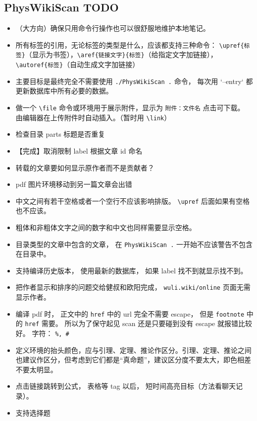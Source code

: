 \subsection{PhysWikiScan TODO}\label{sub_edTODO_6}
\begin{itemize}
\item （大方向）确保只用命令行操作也可以很舒服地维护本地笔记。
\item 所有标签的引用，无论标签的类型是什么，应该都支持三种命令： \verb`\upref{标签}`（显示为书签），\verb`\aref{链接文字}{标签}`（给指定文字加链接）， \verb`\autoref{标签}`（自动生成文字加链接）
\item 主要目标是最终完全不需要使用 \verb`./PhysWikiScan .` 命令， 每次用 `--entry` 都更新数据库中所有必要的数据。
\item 做一个 \verb`\file` 命令或环境用于展示附件，显示为 \verb`附件：文件名` 点击可下载。 由编辑器在上传附件时自动插入。（暂时用 \verb`\link`）
\item 检查目录 parts 标题是否重复
\item 【完成】取消限制 label 根据文章 id 命名
\item 转载的文章要如何显示原作者而不是贡献者？
\item pdf 图片环境移动到另一篇文章会出错
\item 中文之间有若干空格或者一个空行不应该影响排版。 \verb`\upref` 后面如果有空格也不应该。
\item 粗体和非粗体文字之间的数字和中文也同样需要显示空格。
\item 目录类型的文章中包含的文章， 在 \verb`PhysWikiScan .` 一开始不应该警告不包含在目录中。
\item 支持编译历史版本， 使用最新的数据库， 如果 label 找不到就显示找不到。
\item 把作者显示和排序的问题交给健叔和欧阳完成， \verb`wuli.wiki/online` 页面无需显示作者。

\item 编译 pdf 时， 正文中的 \verb`href` 中的 url 完全不需要 escape， 但是 \verb`footnote` 中的 \verb`href` 需要。 所以为了保守起见 scan 还是只要碰到没有 escape 就报错比较好。 字符： \verb`%, #`

\item 定义环境的抬头颜色，应与引理、定理、推论作区分。引理、定理、推论之间也建议作区分，但考虑到它们都是“真命题”，建议区分度不要太大，即色相差不要太明显。

\item 点击链接跳转到公式， 表格等 tag 以后， 短时间高亮目标（方法看聊天记录）。

\item 支持选择题


\end{itemize}
